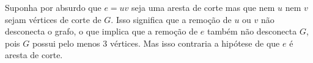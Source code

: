 
Suponha por absurdo que $e = uv$ seja uma aresta de corte mas que nem $u$ nem
$v$ sejam vértices de corte de $G$. Isso significa que a remoção de $u$ ou $v$
não desconecta o grafo, o que implica que a remoção de $e$ também não
desconecta $G$, pois $G$ possui pelo menos 3 vértices. Mas isso contraria a
hipótese de que $e$ é aresta de corte.

